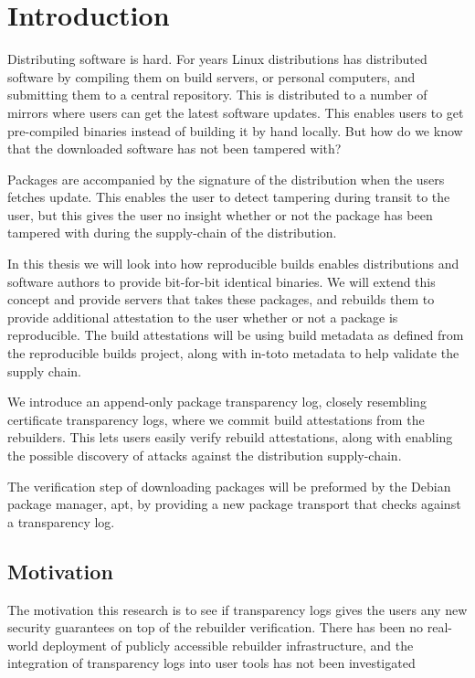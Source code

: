 \documentclass[../Main/thesis.tex]{subfiles}
\begin{document}
\chapter{Introduction}\label{ch:introduction}
Distributing software is hard. For years Linux distributions has distributed
software by compiling them on build servers, or personal computers, and
submitting them to a central repository. This is distributed to a number of
mirrors where users can get the latest software updates. This enables users to
get pre-compiled binaries instead of building it by hand locally. But how do we
know that the downloaded software has not been tampered with?

Packages are accompanied by the signature of the distribution when the users
fetches update. This enables the user to detect tampering during transit to the
user, but this gives the user no insight whether or not the package has been
tampered with during the supply-chain of the distribution.

In this thesis we will look into how reproducible builds enables distributions
and software authors to provide bit-for-bit identical binaries. We will extend
this concept and provide servers that takes these packages, and rebuilds them to
provide additional attestation to the user whether or not a package is
reproducible. The build attestations will be using build metadata as defined
from the reproducible builds project, along with in-toto metadata to help
validate the supply chain.

We introduce an append-only package transparency log, closely resembling
certificate transparency logs, where we commit build attestations from the
rebuilders. This lets users easily verify rebuild attestations, along with
enabling the possible discovery of attacks against the distribution
supply-chain.

The verification step of downloading packages will be preformed by the Debian
package manager, apt, by providing a new package transport that checks against a
transparency log.


\section{Motivation}\label{sec:motivation}
The motivation this research is to see if transparency logs gives the users any
new security guarantees on top of the rebuilder verification. There has been no
real-world deployment of publicly accessible rebuilder infrastructure, and the
integration of transparency logs into user tools has not been investigated 
\end{document}
